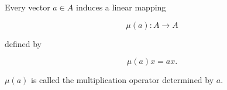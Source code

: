 Every vector $a \in A$ induces a linear mapping

$$\mu(a) \colon A \rightarrow A$$

defined by

$$\mu(a)x = ax.$$

$\mu(a)$ is called the multiplication operator determined by $a$.
